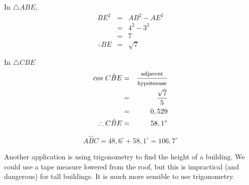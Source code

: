 \begin{wex}
{
In $\triangle ABE$, \\
\begin{eqnarray*}
  BE^{2} & = & AB^{2} - AE^{2} \\
        & = & 4^{2} - 3^{2} \\
        & = & 7 \\
  \therefore BE & = & \sqrt{7}
\end{eqnarray*}

In $\triangle CBE$ 
\begin{eqnarray*}
  cos~ C\hat{B}E & = & \frac{\mbox{\footnotesize adjacent}}{\mbox{\footnotesize hypotenuse}} \\
                 & = & \dfrac{\sqrt{7}}{5} \\
                 & = & 0,529 \\
  \therefore C\hat{B}E & = & {58,1}^{\circ}
\end{eqnarray*}

\begin{equation*}
  A\hat{B}C = 48,6^{\circ} + 58,1^{\circ} = 106,7^{\circ}
\end{equation*}
}
\end{wex}

  
Another application is using trigonometry to find the height of a building. We could use a tape measure lowered from the roof, but this is impractical (and dangerous) for tall buildings. It is much more sensible to use trigonometry.\par 

